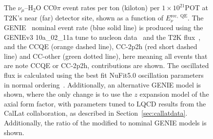 \documentclass{ar-1col}
\begin{document}
\begin{figure}[htbp]
  \centering
  \captionsetup[subfloat]{captionskip=-5pt}
  \hspace{75pt}
  \vspace{11pt}
  \caption{The $\nu_{\mu}$--H$_{2}$O CC0$\pi$ event rates per ton (kiloton) per $1\times10^{21}$POT at T2K's near (far) detector site, shown as a function of $E^{\mathrm{rec,\;QE}}_{\nu}$. The GENIE~\cite{Andreopoulos:2009rq, GENIE:2021npt} nominal event rate (blue solid line) is produced using the GENIEv3 10a\_02\_11a tune to nucleon data~\cite{GENIE:2021zuu} and the T2K flux~\cite{T2K:2012bge}, and the CCQE (orange dashed line), CC-2p2h (red short dashed line) and CC-other (green dotted line), here meaning all events that are note CCQE or CC-2p2h, contributions are shown. The oscillated flux is calculated using the best fit NuFit5.0 oscillation parameters in normal ordering~\cite{Esteban:2020cvm, nufitweb}. Additionally, an alternative GENIE model is shown, where the only change is to use the $z$ expansion model of the axial form factor, with parameters tuned to LQCD results from the CalLat collaboration, as described in Section~\ref{sec:callatdata}. Additionally, the ratio of the modified to nominal GENIE models is shown.}
  \label{fig:t2k_impact}
\end{figure}
\end{document}

